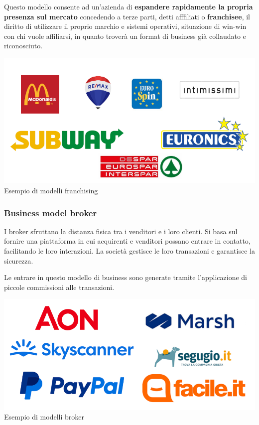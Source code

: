\documentclass[14pt]{extarticle}
\begin{document}
Questo modello consente ad un'azienda di \textbf{espandere rapidamente la
propria presenza sul mercato} concedendo a terze parti, detti afffiliati o
\textbf{franchisee}, il diritto di utilizzare il proprio marchio e sistemi
operativi, situazione di win-win con chi vuole affiliarsi, in quanto troverà un
format di business già collaudato e riconosciuto.

\begin{center}
    \includegraphics[scale=0.55]{images/franchising.png}
    Esempio di modelli franchising
\end{center}

\subsubsection{Business model broker}

I broker sfruttano la distanza fisica tra i venditori e i loro clienti. Si basa
sul fornire una piattaforma in cui acquirenti e venditori possano entrare in
contatto, facilitando le loro interazioni. La società gestisce le loro
transazioni e garantisce la sicurezza.

Le entrare in questo modello di business sono generate tramite l'applicazione di
piccole commissioni alle transazioni.

\begin{center}
    \includegraphics[scale=0.55]{images/broker.png}
    Esempio di modelli broker
\end{center}
\end{document}
